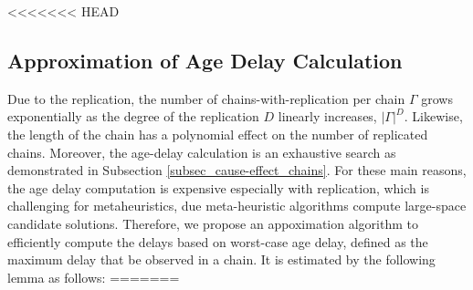 <<<<<<< HEAD
\subsection{Approximation of Age Delay Calculation}
Due to the replication, the number of chains-with-replication per chain $\Gamma$ grows exponentially as the degree of the replication $D$ linearly increases, $|\Gamma|^D$. Likewise, the length of the chain has a polynomial effect on the number of replicated chains. Moreover, the age-delay calculation is an exhaustive search as demonstrated in Subsection \ref{subsec_cause-effect_chains}. For these main reasons, the age delay computation is expensive especially with replication, which is challenging for metaheuristics, due meta-heuristic algorithms compute large-space candidate solutions. Therefore, we propose an appoximation algorithm to efficiently compute the delays based on worst-case age delay, defined as the maximum delay that be observed in a chain. It is estimated by the following lemma as follows:
=======
